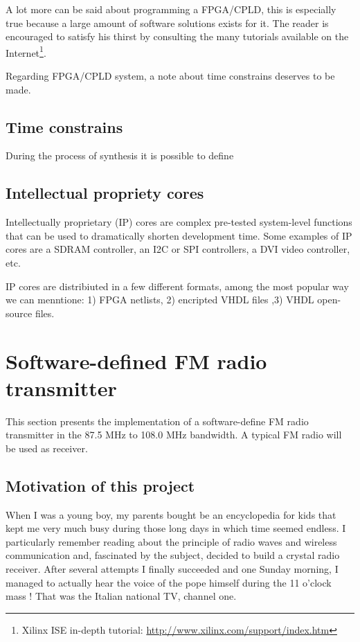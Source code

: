 \documentclass[13pt]{extreport}
\begin{document}
A lot more can be said about programming a FPGA/CPLD, this is especially true because a large amount of software solutions exists for it. The reader is encouraged to satisfy his thirst by consulting the many tutorials available on the Internet\footnote{Xilinx ISE in-depth tutorial: \scriptsize\url{http://www.xilinx.com/support/index.htm}}.

Regarding FPGA/CPLD system, a note about time constrains deserves to be made.

\subsection{Time constrains}
During the process of synthesis it is possible to define 

\subsection{Intellectual propriety cores}
Intellectually proprietary (IP) cores are complex pre-tested system-level functions that can be used to dramatically shorten development time. Some examples of IP cores are a SDRAM controller, an I2C or SPI controllers, a DVI video controller, etc.

IP cores are distribiuted in a few different formats, among the most popular way we can menntione: 1) FPGA netlists, 2) encripted VHDL files ,3) VHDL open-source files.

\section{Software-defined FM radio transmitter}
This section presents the implementation of a software-define FM radio transmitter in the 87.5 MHz to 108.0 MHz bandwidth. A typical FM radio will be used as receiver.

\subsection{Motivation of this project}
When I was a young boy, my parents bought be an encyclopedia for kids that kept me very much busy during those long days in which time seemed endless. I particularly remember reading about the principle of radio waves and wireless communication and, fascinated by the subject, decided to build a crystal radio receiver. After several attempts I finally succeeded and one Sunday morning, I managed to actually hear the voice of the pope himself during the 11 o'clock mass ! That was the Italian national TV, channel one.
\end{document}
